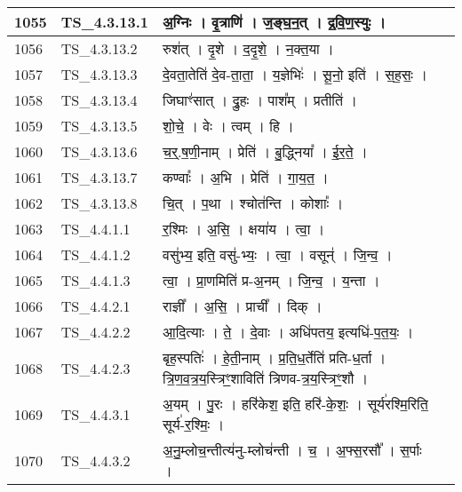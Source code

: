 \documentclass[17pt]{extarticle}
\begin{document}
\begin{longtable}{||p{0.4in}||p{0.9in}||p{4.0in}||p{0.9in}||}
            1055 & TS\_4.3.13.1 & अ॒ग्निः   ।   वृ॒त्राणि॑   ।   ज॒ङ्घ॒न॒त्   ।   द्र॒वि॒ण॒स्युः   ।    &      \\
        \hline
            1056 & TS\_4.3.13.2 & रुश॑त्   ।   दृ॒शे   ।   द॒दृ॒शे॒   ।   न॒क्त॒या   ।    &      \\
        \hline
            1057 & TS\_4.3.13.3 & दे॒वता॒तेति॑ दे॒व{-}ता॒ता॒   ।   य॒ज्ञेभिः॑   ।   सू॒नो॒ इति॑   ।   स॒ह॒सः॒   ।    &      \\
        \hline
            1058 & TS\_4.3.13.4 & जिघाꣳ॑सात्   ।   द्रु॒हः   ।   पाश᳚म्   ।   प्रतीति॑   ।    &      \\
        \hline
            1059 & TS\_4.3.13.5 & शो॒चे॒   ।   वेः   ।   त्वम्   ।   हि   ।    &      \\
        \hline
            1060 & TS\_4.3.13.6 & च॒र्॒.ष॒णी॒नाम्   ।   प्रेति॑   ।   बु॒द्ध्निया᳚   ।   ई॒र॒ते॒   ।    &      \\
        \hline
            1061 & TS\_4.3.13.7 & कण्वाः᳚   ।   अ॒भि   ।   प्रेति॑   ।   गा॒य॒त॒   ।    &      \\
        \hline
            1062 & TS\_4.3.13.8 & चि॒त्   ।   प॒था   ।   श्चोत॑न्ति   ।   कोशाः᳚   ।    &      \\
        \hline
            1063 & TS\_4.4.1.1 & र॒श्मिः   ।   अ॒सि॒   ।   क्षया॑य   ।   त्वा॒   ।    &      \\
        \hline
            1064 & TS\_4.4.1.2 & वसु॑भ्य॒ इति॒ वसु॑{-}भ्यः॒   ।   त्वा॒   ।   वसून्॑   ।   जि॒न्व॒   ।    &      \\
        \hline
            1065 & TS\_4.4.1.3 & त्वा॒   ।   प्रा॒णमिति॑ प्र{-}अ॒नम्   ।   जि॒न्व॒   ।   य॒न्ता   ।    &      \\
        \hline
            1066 & TS\_4.4.2.1 & राज्ञी᳚   ।   अ॒सि॒   ।   प्राची᳚   ।   दिक्   ।    &      \\
        \hline
            1067 & TS\_4.4.2.2 & आ॒दि॒त्याः   ।   ते॒   ।   दे॒वाः   ।   अधि॑पतय॒ इत्यधि॑{-}प॒त॒यः॒   ।    &      \\
        \hline
            1068 & TS\_4.4.2.3 & बृह॒स्पतिः॑   ।   हे॒ती॒नाम्   ।   प्र॒ति॒ध॒र्तेति॑ प्रति{-}ध॒र्ता   ।   त्रि॒ण॒व॒त्र॒य॒स्त्रिꣳ॒॒शाविति॑ त्रिणव{-}त्र॒य॒स्त्रिꣳ॒॒शौ   ।    &      \\
        \hline
            1069 & TS\_4.4.3.1 & अ॒यम्   ।   पु॒रः   ।   हरि॑केश॒ इति॒ हरि॑{-}के॒शः॒   ।   सूर्य॑रश्मि॒रिति॒ सूर्य॑{-}र॒श्मिः॒   ।    &      \\
        \hline
            1070 & TS\_4.4.3.2 & अ॒नु॒म्लोच॒न्तीत्य॑नु{-}म्लोच॑न्ती   ।   च॒   ।   अ॒फ्स॒रसौ᳚   ।   स॒र्पाः   ।    &      \\

\end{longtable}
\end{document}
